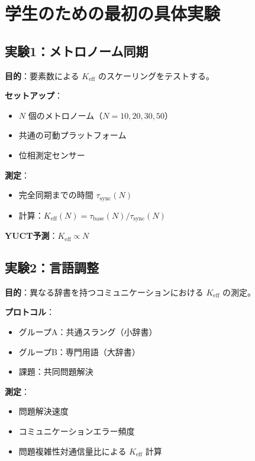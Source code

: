\documentclass[12pt,a4paper]{article}
\begin{document}
	\section{学生のための最初の具体実験}
	
	\subsection{実験1：メトロノーム同期}
	
	\textbf{目的}：要素数による \(K_{\mathrm{eff}}\) のスケーリングをテストする。
	
	\textbf{セットアップ}：
	\begin{itemize}
		\item $N$ 個のメトロノーム（$N = 10, 20, 30, 50$）
		\item 共通の可動プラットフォーム
		\item 位相測定センサー
	\end{itemize}
	
	\textbf{測定}：
	\begin{itemize}
		\item 完全同期までの時間 $\tau_{\mathrm{sync}}(N)$
		\item 計算：$K_{\mathrm{eff}}(N) = \tau_{\mathrm{base}}(N)/\tau_{\mathrm{sync}}(N)$
	\end{itemize}
	
	\textbf{YUCT予測}：$K_{\mathrm{eff}} \propto N$
	
	\subsection{実験2：言語調整}
	
	\textbf{目的}：異なる辞書を持つコミュニケーションにおける \(K_{\mathrm{eff}}\) の測定。
	
	\textbf{プロトコル}：
	\begin{itemize}
		\item グループA：共通スラング（小辞書）
		\item グループB：専門用語（大辞書）
		\item 課題：共同問題解決
	\end{itemize}
	
	\textbf{測定}：
	\begin{itemize}
		\item 問題解決速度
		\item コミュニケーションエラー頻度
		\item 問題複雑性対通信量比による \(K_{\mathrm{eff}}\) 計算
	\end{itemize}
	
\end{document}
